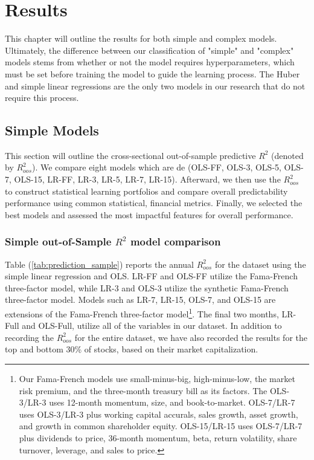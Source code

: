 %
\chapter{Results}

This chapter will outline the results for both simple and complex models. Ultimately, the difference between our classification of "simple" and "complex" models stems from whether or not the model requires hyperparameters, which must be set before training the model to guide the learning process. The Huber and simple linear regressions are the only two models in our research that do not require this process.

\section{Simple Models}

This section will outline the cross-sectional out-of-sample predictive $R^2$ (denoted by $R^2_{oos}$). We compare eight models which are de (OLS-FF, OLS-3, OLS-5, OLS-7, OLS-15, LR-FF, LR-3, LR-5, LR-7, LR-15). Afterward, we then use the $R^2_{oos}$ to construct statistical learning portfolios and compare overall predictability performance using common statistical, financial metrics. Finally, we selected the best models and assessed the most impactful features for overall performance.

\subsection{Simple out-of-Sample $R^2$ model comparison}

Table (\ref{tab:prediction_sample}) reports the annual $R^2_{oos}$ for the dataset using the simple linear regression and OLS. LR-FF and OLS-FF utilize the Fama-French three-factor model, while LR-3 and OLS-3 utilize the synthetic Fama-French three-factor model. Models such as LR-7, LR-15, OLS-7, and OLS-15 are extensions of the Fama-French three-factor model\footnote{Our Fama-French models use small-minus-big, high-minus-low, the market risk premium, and the three-month treasury bill as its factors. The OLS-3/LR-3 uses 12-month momentum, size, and book-to-market. OLS-7/LR-7 uses OLS-3/LR-3 plus working capital accurals, sales growth, asset growth, and growth in common shareholder equity. OLS-15/LR-15 uses OLS-7/LR-7 plus dividends to price, 36-month momentum, beta, return volatility, share turnover, leverage, and sales to price.}. The final two months, LR-Full and OLS-Full, utilize all of the variables in our dataset. In addition to recording the $R^2_{oos}$ for the entire dataset, we have also recorded the results for the top and bottom 30\% of stocks, based on their market capitalization.

